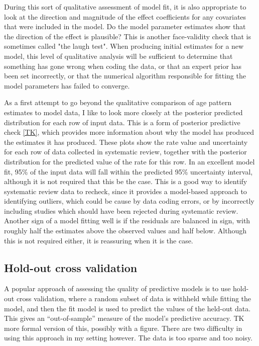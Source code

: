 During this sort of qualitative assessment of model fit, it is also
appropriate to look at the direction and magnitude of the effect
coefficients for any covariates that were included in the model.  Do
the model parameter estimates show that the direction of the effect is
plausible?  This is another face-validity check that is sometimes
called "the laugh test".  When producing initial estimates for a new
model, this level of qualitative analysis will be sufficient to determine
that something has gone wrong when coding the data, or that an expert
prior has been set incorrectly, or that the numerical algorithm
responsible for fitting the model parameters has failed to converge.

As a first attempt to go beyond the qualitative comparison of age
pattern estimates to model data, I like to look more closely at the
posterior predicted distribution for each row of input data.  This is
a form of posterior predictive check \ref{TK}, which provides more
information about why the model has produced the estimates it has produced.
These plots show the rate value and uncertainty for each row of data
collected in systematic review, together with the posterior
distribution for the predicted value of the rate for this row.  In an
excellent model fit, 95\% of the input data will fall within the 
predicted 95\% uncertainty interval, although it is not required that this be
the case.    This is a good way to identify systematic review data to
recheck, since it provides a model-based approach to identifying
outliers, which could be cause by data coding errors, or by
incorrectly including studies which should have been rejected during
systematic review.  Another sign of a model fitting well is if the residuals
are balanced in sign, with roughly half the estimates above the
observed values and half below.  Although this is not required either,
it is reassuring when it is the case.


\subsection{Hold-out cross validation}
A popular approach of assessing the quality of predictive models is to
use hold-out cross validation, where a random subset of data is
withheld while fitting the model, and then the fit model is used to
predict the values of the held-out data.  This gives an
``out-of-sample'' measure of the model's predictive accuracy.  TK more
formal version of this, possibly with a figure. There are two
difficulty in using this approach in my setting however.  The data is
too sparse and too noisy.

